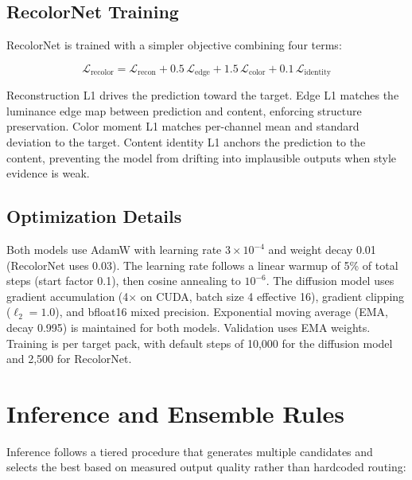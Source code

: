 \subsection{RecolorNet Training}

RecolorNet is trained with a simpler objective combining four terms:

\begin{equation}
    \mathcal{L}_{\text{recolor}} = \mathcal{L}_{\text{recon}} + 0.5\,\mathcal{L}_{\text{edge}} + 1.5\,\mathcal{L}_{\text{color}} + 0.1\,\mathcal{L}_{\text{identity}}
\end{equation}

Reconstruction L1 drives the prediction toward the target. Edge L1 matches the luminance edge map between prediction and content, enforcing structure preservation. Color moment L1 matches per-channel mean and standard deviation to the target. Content identity L1 anchors the prediction to the content, preventing the model from drifting into implausible outputs when style evidence is weak.

\subsection{Optimization Details}

Both models use AdamW with learning rate $3 \times 10^{-4}$ and weight decay 0.01 (RecolorNet uses 0.03). The learning rate follows a linear warmup of 5\% of total steps (start factor 0.1), then cosine annealing to $10^{-6}$. The diffusion model uses gradient accumulation (4$\times$ on CUDA, batch size 4 effective 16), gradient clipping ($\ell_2 = 1.0$), and bfloat16 mixed precision. Exponential moving average (EMA, decay 0.995) is maintained for both models. Validation uses EMA weights. Training is per target pack, with default steps of 10,000 for the diffusion model and 2,500 for RecolorNet.

\section{Inference and Ensemble Rules}
\label{sec:inference}

Inference follows a tiered procedure that generates multiple candidates and selects the best based on measured output quality rather than hardcoded routing:



